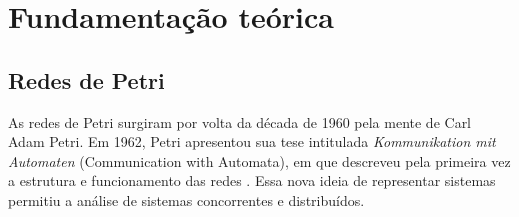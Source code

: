 \documentclass[
	12pt,				%
	openright,			%
	oneside,			%
	a4paper,			%
	english,			%
	brazil				%
	]{abntex2}
\theoremstyle{doispontos}
\begin{document}

\chapter{Fundamentação teórica} \label{cap:revisao-de-literatura}







\section{Redes de Petri}

As redes de Petri surgiram por volta da década de 1960 pela mente de Carl Adam Petri. Em 1962, Petri apresentou sua tese intitulada \textit{Kommunikation mit Automaten} (Communication with Automata), em que descreveu pela primeira vez a estrutura e funcionamento das redes \textcite{petri1962kommunikation}. Essa nova ideia de representar sistemas permitiu a análise de sistemas concorrentes e distribuídos.
\end{document}
